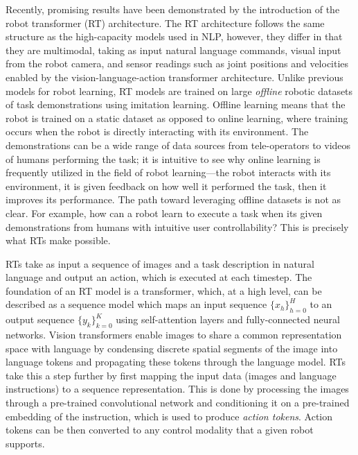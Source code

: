 \documentclass[fleqn,10pt]{wlscirep}\twocolumn
\begin{document}
Recently, promising results have been demonstrated by the introduction of the robot transformer (RT) architecture\cite{brohan2022rt, brohan2023rt, open_x_embodiment_rt_x_2023}. %
The RT architecture follows the same structure as the high-capacity models used in NLP, however, they differ in that they are multimodal, taking as input natural language commands, visual input from the robot camera, and sensor readings such as joint positions and velocities enabled by the vision-language-action transformer architecture.
Unlike previous models for robot learning, RT models are trained on large \textit{offline} robotic datasets of task demonstrations using imitation learning.
Offline learning means that the robot is trained on a static dataset as opposed to online learning, where training occurs when the robot is directly interacting with its environment. 
The demonstrations can be a wide range of data sources from tele-operators to videos of humans performing the task; it is intuitive to see why online learning is frequently utilized in the field of robot learning---the robot interacts with its environment, it is given feedback on how well it performed the task, then it improves its performance.
The path toward leveraging offline datasets is not as clear.
For example, how can a robot learn to execute a task when its given demonstrations from humans with intuitive user controllability?
This is precisely what RTs make possible.


RTs take as input a sequence of images and a task description in natural language and output an action, which is executed at each timestep.
The foundation of an RT model is a transformer, which, at a high level, can be described as a sequence model which maps an input sequence $\{x_h\}^{H}_{h=0}$ to an output sequence $\{y_k\}^{K}_{k=0}$ using self-attention layers and fully-connected neural networks\cite{vaswani2017attention}. 
Vision transformers enable images to share a common representation space with language by condensing discrete spatial segments of the image into language tokens and propagating these tokens through the language model\cite{dosovitskiy2020image}.
RTs take this a step further by first mapping the input data (images and language instructions) to a sequence representation. 
This is done by processing the images through a pre-trained convolutional network and conditioning it on a pre-trained embedding of the instruction, which is used to produce \textit{action tokens}. 
Action tokens can be then converted to any control modality that a given robot supports.
\end{document}
